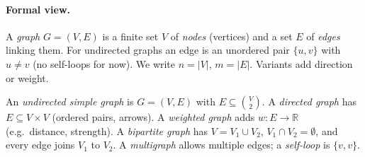 \paragraph{Formal view.} A \emph{graph} $G=(V,E)$ is a finite set $V$ of \emph{nodes} (vertices) and a set $E$ of \emph{edges} linking them. For undirected graphs an edge is an unordered pair $\{u,v\}$ with $u\neq v$ (no self-loops for now). We write $n=|V|$, $m=|E|$. Variants add direction or weight.

\begin{definition}\label{def:graph}
An \emph{undirected simple graph} is $G=(V,E)$ with $E\subseteq\binom{V}{2}$. A \emph{directed graph} has $E\subseteq V\times V$ (ordered pairs, arrows). A \emph{weighted graph} adds $w:E\to\mathbb{R}$ (e.g.\ distance, strength). A \emph{bipartite graph} has $V=V_1\cup V_2$, $V_1\cap V_2=\emptyset$, and every edge joins $V_1$ to $V_2$. A \emph{multigraph} allows multiple edges; a \emph{self-loop} is $\{v,v\}$.
\end{definition}

